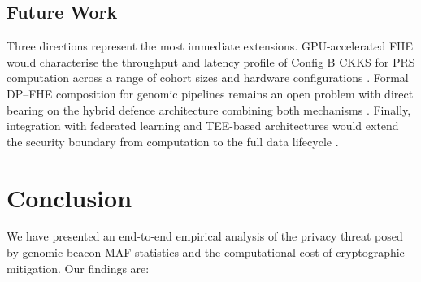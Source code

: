 \documentclass[conference]{IEEEtran}
\begin{document}
\subsection{Future Work}

Three directions represent the most immediate extensions. GPU-accelerated FHE
would characterise the throughput and latency profile of Config B CKKS for PRS
computation across a range of cohort sizes and hardware configurations \cite{
jung2021,jin2025}. Formal DP--FHE composition for genomic pipelines remains an
open problem with direct bearing on the hybrid defence architecture combining
both mechanisms \cite{cho2024,johnson2013}. Finally, integration with federated
learning and TEE-based architectures would extend the security boundary from
computation to the full data lifecycle \cite{mo2021}.

\section{Conclusion}

We have presented an end-to-end empirical analysis of the privacy threat posed
by genomic beacon MAF statistics and the computational cost of cryptographic
mitigation. Our findings are:
\end{document}
